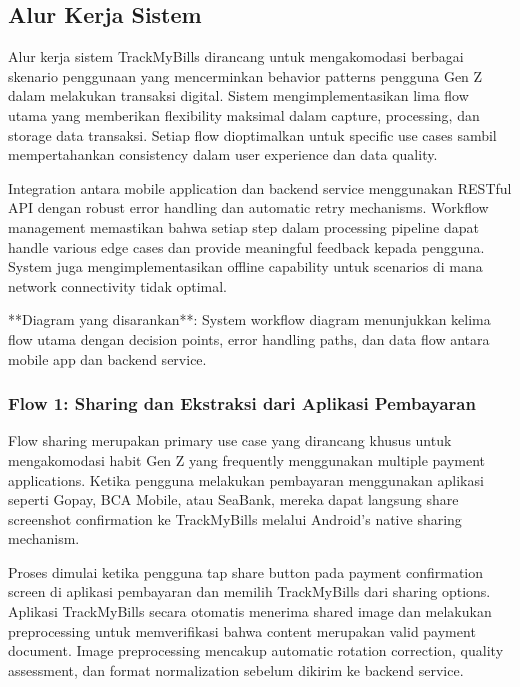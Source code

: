 \subsection{Alur Kerja Sistem}
\label{subsec:alur-kerja-sistem}

Alur kerja sistem TrackMyBills dirancang untuk mengakomodasi berbagai skenario penggunaan yang mencerminkan behavior patterns pengguna Gen Z dalam melakukan transaksi digital. Sistem mengimplementasikan lima flow utama yang memberikan flexibility maksimal dalam capture, processing, dan storage data transaksi. Setiap flow dioptimalkan untuk specific use cases sambil mempertahankan consistency dalam user experience dan data quality.

Integration antara mobile application dan backend service menggunakan RESTful API dengan robust error handling dan automatic retry mechanisms. Workflow management memastikan bahwa setiap step dalam processing pipeline dapat handle various edge cases dan provide meaningful feedback kepada pengguna. System juga mengimplementasikan offline capability untuk scenarios di mana network connectivity tidak optimal.

**Diagram yang disarankan**: System workflow diagram menunjukkan kelima flow utama dengan decision points, error handling paths, dan data flow antara mobile app dan backend service.

\subsubsection{Flow 1: Sharing dan Ekstraksi dari Aplikasi Pembayaran}
\label{subsubsec:flow-sharing}

Flow sharing merupakan primary use case yang dirancang khusus untuk mengakomodasi habit Gen Z yang frequently menggunakan multiple payment applications. Ketika pengguna melakukan pembayaran menggunakan aplikasi seperti Gopay, BCA Mobile, atau SeaBank, mereka dapat langsung share screenshot confirmation ke TrackMyBills melalui Android's native sharing mechanism.

Proses dimulai ketika pengguna tap share button pada payment confirmation screen di aplikasi pembayaran dan memilih TrackMyBills dari sharing options. Aplikasi TrackMyBills secara otomatis menerima shared image dan melakukan preprocessing untuk memverifikasi bahwa content merupakan valid payment document. Image preprocessing mencakup automatic rotation correction, quality assessment, dan format normalization sebelum dikirim ke backend service.

